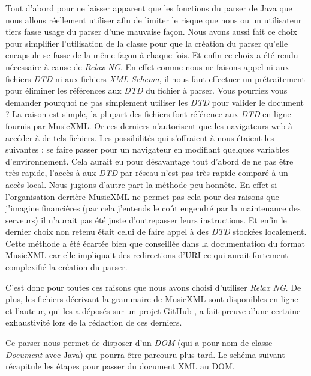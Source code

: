 \par
Tout d'abord pour ne laisser apparent que les fonctions du parser de Java que
nous allons réellement utiliser afin de limiter le risque que nous ou un utilisateur
tiers fasse usage du parser d'une mauvaise façon. Nous avons aussi fait ce choix pour simplifier
l'utilisation de la classe pour que la création du parser qu'elle encapsule se fasse de la même façon à chaque fois.
Et enfin ce choix a été rendu nécessaire à cause de \emph{Relax NG}. En effet comme nous
ne faisons appel ni aux fichiers \emph{DTD} ni aux fichiers \emph{XML Schema}, il nous
faut effectuer un prétraitement pour éliminer les références aux \emph{DTD} du
fichier à parser. Vous pourriez vous demander pourquoi ne pas simplement
utiliser les \emph{DTD} pour valider le document ? La raison est simple,
la plupart des fichiers font référence aux \emph{DTD} en ligne fournis par
MusicXML. Or ces derniers n'autorisent que les navigateurs web à accéder à de tels
fichiers. Les possibilités qui s'offraient à nous étaient les suivantes : se faire
passer pour un navigateur en modifiant quelques variables d’environnement. Cela
aurait eu pour désavantage tout d'abord de ne pas être très rapide, l'accès à
aux \emph{DTD} par réseau n'est pas très rapide comparé à un accès local.
Nous jugions d'autre part la méthode peu honnête. En effet si l'organisation derrière MusicXML
ne permet pas cela pour des raisons que j'imagine financières (par cela j'entends le coût engendré par la maintenance des serveurs)
il n'aurait pas été juste d'outrepasser leurs instructions. Et enfin le dernier choix non retenu était celui de faire appel
à des \emph{DTD} stockées localement. Cette méthode a été écartée bien que conseillée
dans la documentation du format MusicXML car elle impliquait des redirections d'URI
ce qui aurait fortement complexifié la création du parser.


\par
C'est donc pour toutes ces raisons que nous avons choisi d'utiliser \emph{Relax NG}.
De plus, les fichiers décrivant la grammaire de MusicXML sont disponibles en ligne
et l'auteur, qui les a déposés sur un projet GitHub \cite{relaxng_for_musicxml},
a fait preuve d'une certaine exhaustivité lors de la rédaction de ces derniers.

\par
Ce parser nous permet de disposer d'un \emph{DOM} (qui a pour nom de classe \emph{Document} avec Java)
qui pourra être parcouru plus tard. Le schéma suivant récapitule les étapes pour passer du document XML au DOM.


